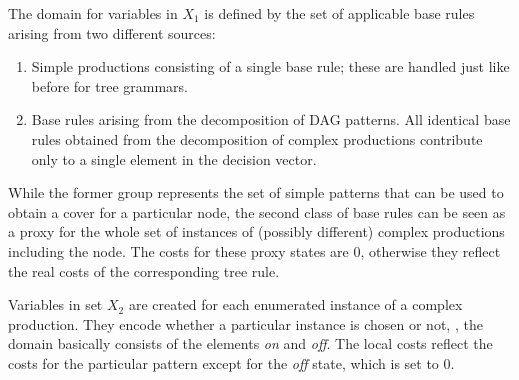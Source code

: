 The domain for variables in $X_1$ is defined by the set of applicable
base rules arising from two different sources:
\begin{enumerate}
\item Simple productions consisting of a single base rule; these are
  handled just like before for tree grammars.
\item Base rules arising from the decomposition of DAG patterns. All
  identical base rules obtained from the decomposition of complex
  productions contribute only to a single element in the decision
  vector.
\end{enumerate}
While the former group represents the set of simple patterns that can
be used to obtain a cover for a particular node, the second class of
base rules can be seen as a proxy for the whole set of instances of
(possibly different) complex productions including the node. The
costs for these proxy states are $0$, otherwise they reflect the
real costs of the corresponding tree rule.

Variables in set $X_2$ are created for each enumerated instance of a
complex production. They encode whether a particular instance is
chosen or not, \ie, the domain basically consists of the elements
\textit{on} and \textit{off}. The local costs reflect the costs for
the particular pattern except for the \textit{off} state, which is set
to $0$.

